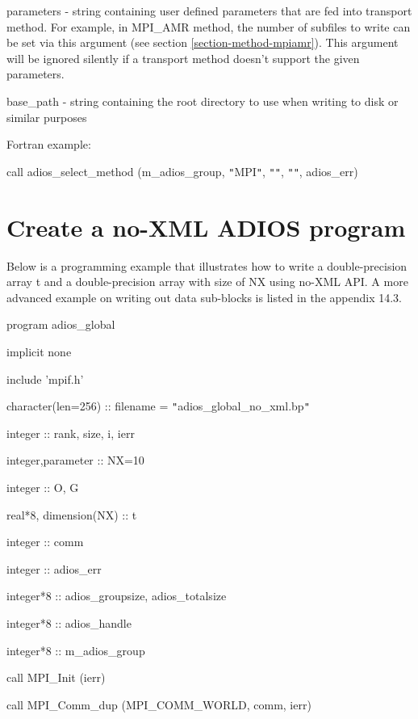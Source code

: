 parameters - string containing user defined parameters that are fed into transport 
method.  For example, in MPI\_AMR method, the number of subfiles to write can be 
set via this argument (see section \ref{section-method-mpiamr}).  This argument will be ignored silently 
if a transport method doesn't support the given parameters.

base\_path -  string containing the root directory to use when writing to disk 
or similar purposes

\leftskip=22pt
Fortran example: 

call adios\_select\_method (m\_adios\_group, \texttt{"}MPI\texttt{"}, \texttt{"}\texttt{"}, 
\texttt{"}\texttt{"}, adios\_err)\label{HToc182553362}

\section{Create a no-XML ADIOS program}

\leftskip=0pt
Below is a programming example that illustrates how to write a double-precision 
array t and a double-precision array with size of NX using no-XML API.   A more 
advanced example on writing out data sub-blocks is listed in the appendix 14.3. 


program adios\_global

\parindent=14pt
implicit none

include 'mpif.h'

\parindent=28pt
character(len=256)      :: filename = \texttt{"}adios\_global\_no\_xml.bp\texttt{"}

\parindent=14pt
integer                 :: rank, size, i, ierr

integer,parameter       :: NX=10

\parindent=28pt
integer                 :: O, G

\parindent=14pt
real*8, dimension(NX)   :: t

integer                 :: comm

\parindent=28pt
integer                 :: adios\_err

\parindent=14pt
integer*8               :: adios\_groupsize, adios\_totalsize

integer*8               :: adios\_handle

\parindent=28pt
integer*8               :: m\_adios\_group

\parindent=14pt
call MPI\_Init (ierr)

call MPI\_Comm\_dup (MPI\_COMM\_WORLD, comm, ierr)

